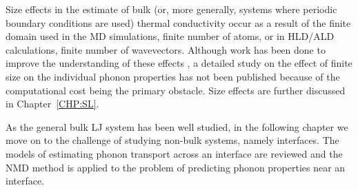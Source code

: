 Size effects in the estimate of bulk (or, more generally, systems where periodic boundary conditions are used) thermal conductivity occur as a result of the finite domain used in the MD simulations, finite number of atoms, or in HLD/ALD calculations, finite number of wavevectors. Although work has been done to improve the understanding of these effects \cite{PhysRevB.81.214305}, a detailed study on the effect of finite size on the individual phonon properties has not been published because of the computational cost being the primary obstacle. Size effects are further discussed in Chapter~\ref{CHP:SL}.

As the general bulk LJ system has been well studied, in the following chapter we move on to the challenge of studying non-bulk systems, namely interfaces. The models of estimating phonon transport across an interface are reviewed and the NMD method is applied to the problem of predicting phonon properties near an interface.
